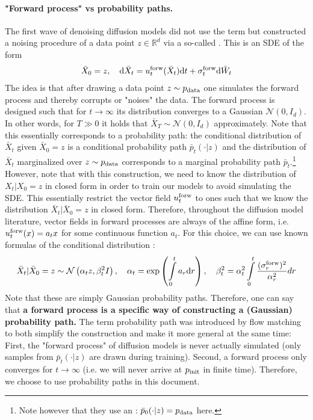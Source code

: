 \paragraph{"Forward process" vs probability paths.} The first wave of denoising diffusion models \citep{sohl2015deep, song2019generative, ho2020denoising, song2020score} did not use the term  but constructed a noising procedure of a data point $z\in\mathbb{R}^d$ via a so-called . This is an SDE of the form
\begin{align}
\label{eq:forward_process}
    \bar{X}_0=z,\quad \mathrm{d} \bar{X}_t = u^{\text{forw}}_t(\bar{X}_t)\mathrm{d} t + \sigma^{\text{forw}}_t \mathrm{d} \bar{W}_t
\end{align}
The idea is that after drawing a data point $z\sim p_{\rm{data}}$ one simulates the forward process and thereby corrupts or "noises" the data. The forward process is designed such that for $t\to \infty$ its distribution converges to a Gaussian $\mathcal{N}(0,I_d)$. In other words, for $T\gg 0$ it holds that $\bar{X}_{T}\sim\mathcal{N}(0,I_d)$ approximately. Note that this essentially corresponds to a probability path: the conditional distribution of $\bar{X}_t$ given $\bar{X}_0=z$ is a conditional probability path $\bar{p}_t(\cdot|z)$ and the distribution of $\bar{X}_t$ marginalized over $z\sim p_{\rm{data}}$ corresponds to a marginal probability path $\bar{p}_t$.\footnote{Note however that they use an : $\bar{p}_0(\cdot|z)=p_{\rm{data}}$ here.} However, note that with this construction, we need to know the distribution of $X_t|X_0=z$ in closed form in order to train our models to avoid simulating the SDE. This essentially restrict the vector field $u^{\text{forw}}_t$ to ones such that we know the distribution $\bar{X}_t|\bar{X}_0=z$ in closed form. Therefore, throughout the diffusion model literature, vector fields in forward processes are always of the affine form, i.e. $u^{\text{forw}}_t(x)=a_t x$ for some continuous function $a_t$. For this choice, we can use known formulas of the conditional distribution \citep{sarkka2019applied,song2021sde, karras2022elucidating}:
\begin{align*}
\bar{X}_t|\bar{X}_0=z\sim\mathcal{N}\left(\alpha_t z,\beta_t^2 I\right),\quad\alpha_t=\exp\left (\int\limits_{0}^{t}a_r\mathrm{d} r\right ),\quad\beta_t^2=\alpha_t^2\int\limits_{0}^{t}\frac{(\sigma^{\text{forw}}_r)^2}{\alpha^2_r}dr
\end{align*}
Note that these are simply Gaussian probability paths. Therefore, one can say that \textbf{a forward process is a specific way of constructing a (Gaussian) probability path.} The term probability path was introduced by flow matching \citep{lipman2022flow} to both simplify the construction and make it more general at the same time: First, the "forward process" of diffusion models is never actually simulated (only samples from $\bar{p}_t(\cdot|z)$ are drawn during training). Second, a forward process only converges for $t\to\infty$ (i.e. we will never arrive at $p_{\rm{init}}$ in finite time). Therefore, we choose to use probability paths in this document.

